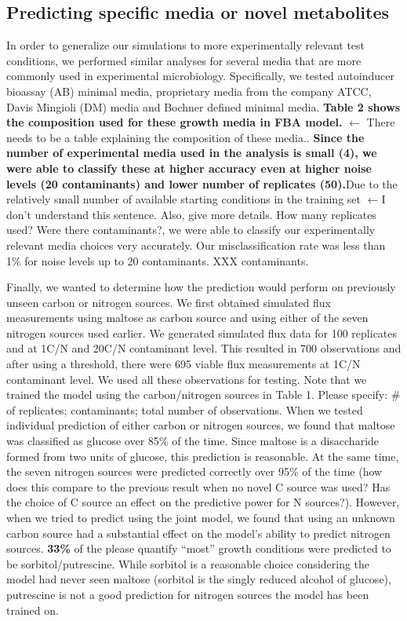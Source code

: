 \documentclass[12pt]{article}
\begin{document}
\subsection*{Predicting specific media or novel metabolites}

In order to generalize our simulations to more experimentally relevant test conditions, we performed similar analyses for several media that are more commonly used in experimental microbiology. Specifically, we tested autoinducer bioassay (AB) minimal media, proprietary media from the company ATCC, Davis Mingioli (DM) media and Bochner defined minimal media. \textbf{Table 2 shows the composition used for these growth media in FBA model.} {\color{red}$\leftarrow$ There needs to be a table explaining the composition of these media.}. \textbf{Since the number of experimental media used in the analysis is small (4), we were able to classify these at higher accuracy even at higher noise levels (20 contaminants) and lower number of replicates (50).}Due to the relatively small number of available starting conditions in the training set {\color{red}$\leftarrow$I don't understand this sentence. Also, give more details. How many replicates used? Were there contaminants?}, we were able to classify our experimentally relevant media choices very accurately. Our misclassification rate was less than 1\% for noise levels up to 20 contaminants. {\color{red}XXX contaminants.}

Finally, we wanted to determine how the prediction would perform on previously unseen carbon or nitrogen sources. We first obtained simulated flux measurements using maltose as carbon source and using either of the seven nitrogen sources used earlier. We generated simulated flux data for 100 replicates and at 1C/N and 20C/N contaminant level. This resulted in 700 observations and after using a threshold, there were 695 viable flux measurements at 1C/N contaminant level. We used all these observations for testing. Note that we trained the model using the carbon/nitrogen sources in Table 1. {\color{red}Please specify: \# of replicates; contaminants; total number of observations.} When we tested individual prediction of either carbon or nitrogen sources, we found that maltose was classified as glucose over 85\% of the time. Since maltose is a disaccharide formed from two units of glucose, this prediction is reasonable. At the same time, the seven nitrogen sources were predicted correctly over 95\% of the time ({\color{red}how does this compare to the previous result when no novel C source was used? Has the choice of C source an effect on the predictive power for N sources?}). However, when we tried to predict using the joint model, we found that using an unknown carbon source had a substantial effect on the model's ability to predict nitrogen sources. \textbf{33\%} of the {\color{red}please quantify ``most''} growth conditions were predicted to be sorbitol/putrescine. While sorbitol is a reasonable choice considering the model had never seen maltose (sorbitol is the singly reduced alcohol of glucose), putrescine is not a good prediction for nitrogen sources the model has been trained on.
\end{document}
